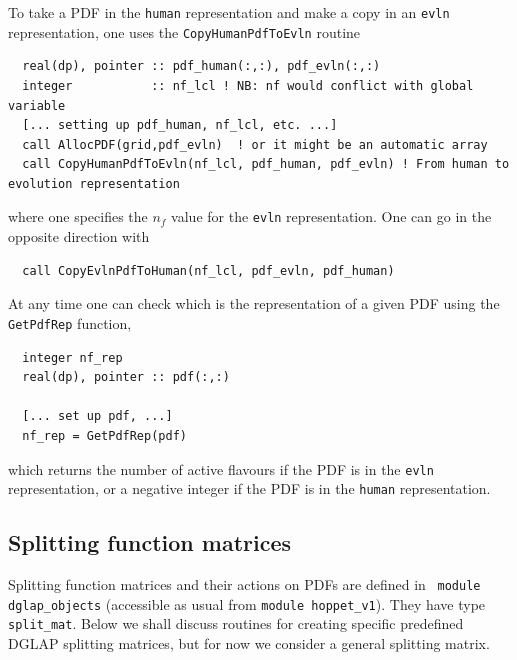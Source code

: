 \documentclass[12pt]{article}
\newcommand{\ttt}[1]{\texttt{#1}}
\begin{document}
To take a PDF in the \ttt{human} representation and make a copy in an
\ttt{evln} representation, one uses the \ttt{CopyHumanPdfToEvln} routine
\begin{lstlisting}
  real(dp), pointer :: pdf_human(:,:), pdf_evln(:,:)
  integer           :: nf_lcl ! NB: nf would conflict with global variable
  [... setting up pdf_human, nf_lcl, etc. ...] 
  call AllocPDF(grid,pdf_evln)  ! or it might be an automatic array
  call CopyHumanPdfToEvln(nf_lcl, pdf_human, pdf_evln) ! From human to evolution representation
\end{lstlisting}
where one specifies the $n_f$ value for the \ttt{evln} representation.
One can go in the opposite direction with
\begin{lstlisting}
  call CopyEvlnPdfToHuman(nf_lcl, pdf_evln, pdf_human)
\end{lstlisting}
At any time one can check which is the representation of a given
PDF using the \ttt{GetPdfRep} function,
\begin{lstlisting}
  integer nf_rep
  real(dp), pointer :: pdf(:,:)

  [... set up pdf, ...]
  nf_rep = GetPdfRep(pdf)
\end{lstlisting}
which returns the number of active flavours if the PDF is in the
\ttt{evln} representation, or a negative integer if 
the PDF is in the
\ttt{human} representation.


\subsection{Splitting function matrices}
\label{sec:splitt-funct-matr}

Splitting function matrices and their actions on PDFs are defined in
   ~\ttt{module dglap\_objects} (accessible as usual from \ttt{module
  hoppet\_v1}). They have type \ttt{split\_mat}. Below we shall discuss
routines for creating specific predefined DGLAP splitting matrices,
but for now we consider a general splitting matrix.
\end{document}

